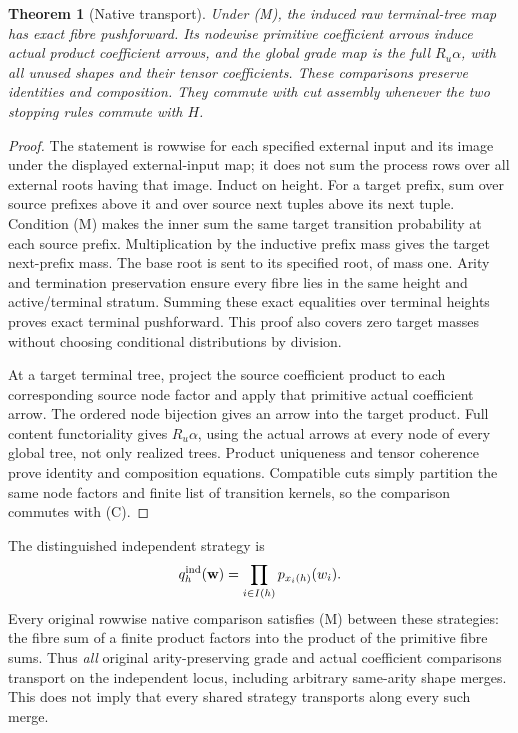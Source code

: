 \documentclass[11pt]{article}
\newtheorem{theorem}{Theorem}
\begin{document}
\begin{theorem}[Native transport]
Under (M), the induced raw terminal-tree map has exact fibre pushforward. Its nodewise primitive coefficient arrows induce actual product coefficient arrows, and the global grade map is the full $R_u\alpha$, with all unused shapes and their tensor coefficients. These comparisons preserve identities and composition. They commute with cut assembly whenever the two stopping rules commute with $H$.
\end{theorem}
\begin{proof}
The statement is rowwise for each specified external input and its image under the displayed external-input map; it does not sum the process rows over all external roots having that image. Induct on height. For a target prefix, sum over source prefixes above it and over source next tuples above its next tuple. Condition (M) makes the inner sum the same target transition probability at each source prefix. Multiplication by the inductive prefix mass gives the target next-prefix mass. The base root is sent to its specified root, of mass one. Arity and termination preservation ensure every fibre lies in the same height and active/terminal stratum. Summing these exact equalities over terminal heights proves exact terminal pushforward. This proof also covers zero target masses without choosing conditional distributions by division.

At a target terminal tree, project the source coefficient product to each corresponding source node factor and apply that primitive actual coefficient arrow. The ordered node bijection gives an arrow into the target product. Full content functoriality gives $R_u\alpha$, using the actual arrows at every node of every global tree, not only realized trees. Product uniqueness and tensor coherence prove identity and composition equations. Compatible cuts simply partition the same node factors and finite list of transition kernels, so the comparison commutes with (C).
\end{proof}

The distinguished independent strategy is
\[
 q^{\rm ind}_h(\mathbf w)=\prod_{i\in I(h)}p_{x_i(h)}(w_i).
\]
Every original rowwise native comparison satisfies (M) between these strategies: the fibre sum of a finite product factors into the product of the primitive fibre sums. Thus \emph{all} original arity-preserving grade and actual coefficient comparisons transport on the independent locus, including arbitrary same-arity shape merges. This does not imply that every shared strategy transports along every such merge.
\end{document}
